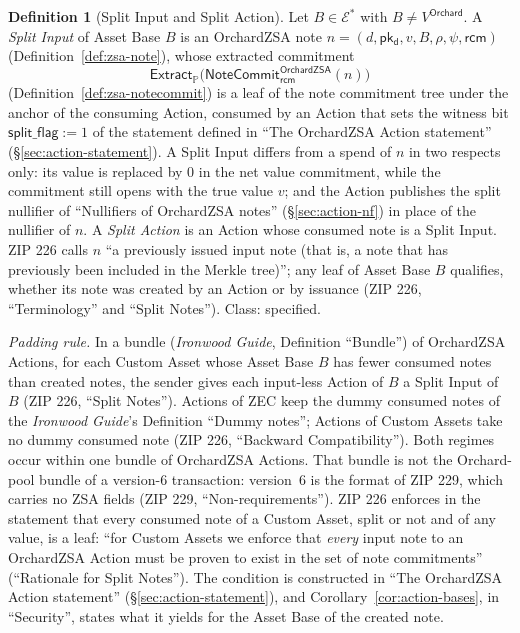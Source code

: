 \documentclass[11pt,a4paper]{article}
\theoremstyle{definition}
\newtheorem{definition}[theorem]{Definition}
\newcommand{\PP}{\mathbb{P}}
\newcommand{\Ep}{\ensuremath{\mathcal{E}}}
\newcommand{\NoteCommit}{\ensuremath{\mathsf{NoteCommit}}}
\newcommand{\Extract}{\ensuremath{\mathsf{Extract}}}
\newcommand{\pkd}{\ensuremath{\mathsf{pk_d}}}
\newcommand{\rcm}{\ensuremath{\mathsf{rcm}}}
\begin{document}
\begin{definition}[Split Input and Split Action]\label{def:split-input}
Let $B \in \Ep^{*}$ with $B \neq V^{\mathsf{Orchard}}$. A \emph{Split Input}
of Asset Base $B$ is an OrchardZSA note
$n = (d, \pkd, v, B, \rho, \psi, \rcm)$ (Definition~\ref{def:zsa-note}),
whose extracted commitment
\[
  \Extract_{\PP}\bigl(\NoteCommit^{\mathsf{OrchardZSA}}_{\rcm}(n)\bigr)
\]
(Definition~\ref{def:zsa-notecommit}) is a leaf of the note commitment tree
under the anchor of the consuming Action, consumed by an Action that sets
the witness bit $\mathsf{split\_flag} := 1$ of the statement defined in
``The OrchardZSA Action statement'' (\S\ref{sec:action-statement}). A Split
Input differs from a spend of $n$ in two respects only: its value is
replaced by $0$ in the net value commitment, while the commitment still
opens with the true value $v$; and the Action publishes the split nullifier
of ``Nullifiers of OrchardZSA notes'' (\S\ref{sec:action-nf}) in place of
the nullifier of $n$. A \emph{Split Action} is an Action whose consumed
note is a Split Input. ZIP 226 calls $n$ ``a previously issued input note
(that is, a note that has previously been included in the Merkle tree)'';
any leaf of Asset Base $B$ qualifies, whether its note was created by an
Action or by issuance (ZIP 226, ``Terminology'' and ``Split Notes''). Class:
specified.
\end{definition}

\emph{Padding rule.} In a bundle (\emph{Ironwood Guide}, Definition
``Bundle'') of OrchardZSA Actions, for each Custom Asset whose Asset Base
$B$ has fewer consumed notes than created notes, the sender gives each
input-less Action of $B$ a Split Input of $B$ (ZIP 226, ``Split Notes'').
Actions of ZEC keep the dummy consumed notes of the \emph{Ironwood Guide}'s
Definition ``Dummy notes''; Actions of Custom Assets take no dummy consumed
note (ZIP 226, ``Backward Compatibility''). Both regimes occur within one
bundle of OrchardZSA Actions. That bundle is not the Orchard-pool bundle of
a version-$6$ transaction: version~$6$ is the format of ZIP 229, which
carries no ZSA fields (ZIP 229, ``Non-requirements''). ZIP 226 enforces in
the statement that every consumed note of a Custom Asset, split or not and
of any value, is a leaf: ``for Custom Assets we enforce that \emph{every}
input note to an OrchardZSA Action must be proven to exist in the set of
note commitments'' (``Rationale for Split Notes''). The condition is
constructed in ``The OrchardZSA Action statement''
(\S\ref{sec:action-statement}), and Corollary~\ref{cor:action-bases}, in
``Security'', states what it yields for the Asset Base of the created note.
\end{document}
